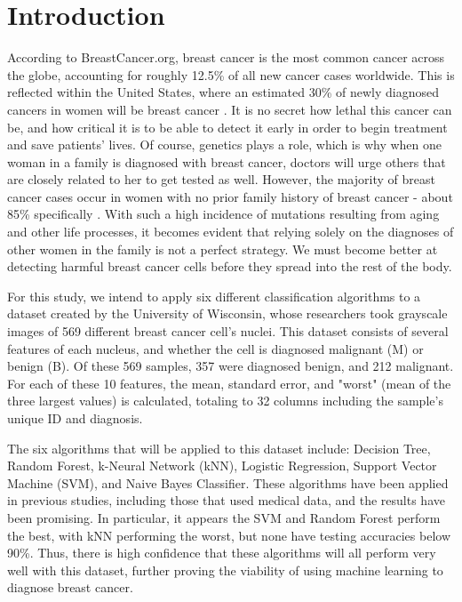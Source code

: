 \documentclass[conference]{IEEEtran}
\begin{document}
\section{Introduction}
According to BreastCancer.org, breast cancer is the most common cancer across the globe, accounting for roughly 12.5\% of all new cancer cases worldwide. This is reflected within the United States, where an estimated 30\% of newly diagnosed cancers in women will be breast cancer \cite{BCorg}. It is no secret how lethal this cancer can be, and how critical it is to be able to detect it early in order to begin treatment and save patients' lives. Of course, genetics plays a role, which is why when one woman in a family is diagnosed with breast cancer, doctors will urge others that are closely related to her to get tested as well. However, the majority of breast cancer cases occur in women with no prior family history of breast cancer - about 85\% specifically \cite{BCorg}. With such a high incidence of mutations resulting from aging and other life processes, it becomes evident that relying solely on the diagnoses of other women in the family is not a perfect strategy. We must become better at detecting harmful breast cancer cells before they spread into the rest of the body.

For this study, we intend to apply six different classification algorithms to a dataset created by the University of Wisconsin, whose researchers took grayscale images of 569 different breast cancer cell's nuclei. This dataset consists of several features of each nucleus, and whether the cell is diagnosed malignant (M) or benign (B). Of these 569 samples, 357 were diagnosed benign, and 212 malignant. For each of these 10 features, the mean, standard error, and "worst" (mean of the three largest values) is calculated, totaling to 32 columns including the sample's unique ID and diagnosis. 

The six algorithms that will be applied to this dataset include: Decision Tree, Random Forest, k-Neural Network (kNN), Logistic Regression, Support Vector Machine (SVM), and Naive Bayes Classifier. These algorithms have been applied in previous studies, including those that used medical data, and the results have been promising. In particular, it appears the SVM and Random Forest perform the best, with kNN performing the worst, but none have testing accuracies below 90\%. Thus, there is high confidence that these algorithms will all perform very well with this dataset, further proving the viability of using machine learning to diagnose breast cancer.
\end{document}

